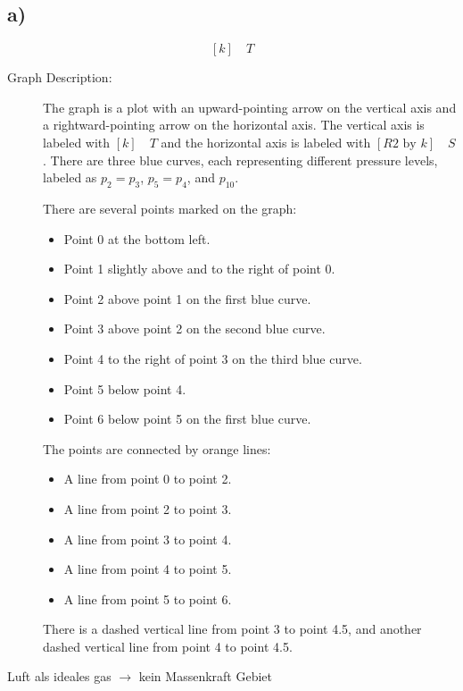 

\subsection*{a)}
\[
[k] \quad T
\]

\begin{description}
    \item[Graph Description:] 
    The graph is a plot with an upward-pointing arrow on the vertical axis and a rightward-pointing arrow on the horizontal axis. The vertical axis is labeled with $[k] \quad T$ and the horizontal axis is labeled with $[R2 \text{ by } k] \quad S$. There are three blue curves, each representing different pressure levels, labeled as $p_2 = p_3$, $p_5 = p_4$, and $p_{10}$. 

    There are several points marked on the graph:
    \begin{itemize}
        \item Point 0 at the bottom left.
        \item Point 1 slightly above and to the right of point 0.
        \item Point 2 above point 1 on the first blue curve.
        \item Point 3 above point 2 on the second blue curve.
        \item Point 4 to the right of point 3 on the third blue curve.
        \item Point 5 below point 4.
        \item Point 6 below point 5 on the first blue curve.
    \end{itemize}
    
    The points are connected by orange lines:
    \begin{itemize}
        \item A line from point 0 to point 2.
        \item A line from point 2 to point 3.
        \item A line from point 3 to point 4.
        \item A line from point 4 to point 5.
        \item A line from point 5 to point 6.
    \end{itemize}
    
    There is a dashed vertical line from point 3 to point 4.5, and another dashed vertical line from point 4 to point 4.5.
\end{description}

\noindent
Luft als ideales gas $\rightarrow$ kein Massenkraft Gebiet